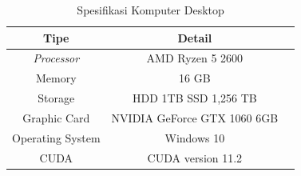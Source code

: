 \begin{longtable}{|c|c|c|}
  \caption{Spesifikasi Komputer Desktop}
  \label{tb:spesifikasikomputer}\\
  \hline
  \textbf{Tipe} & \textbf{Detail}  \\
  \hline
  \textit{Processor} & AMD Ryzen 5 2600 \\ 
  Memory             & 16 GB  \\
  Storage            & HDD 1TB SSD 1,256 TB\\
  Graphic Card       & NVIDIA GeForce GTX 1060 6GB \\
  Operating System   & Windows 10     \\
  CUDA               & CUDA version 11.2    \\              
  \hline
\end{longtable}






